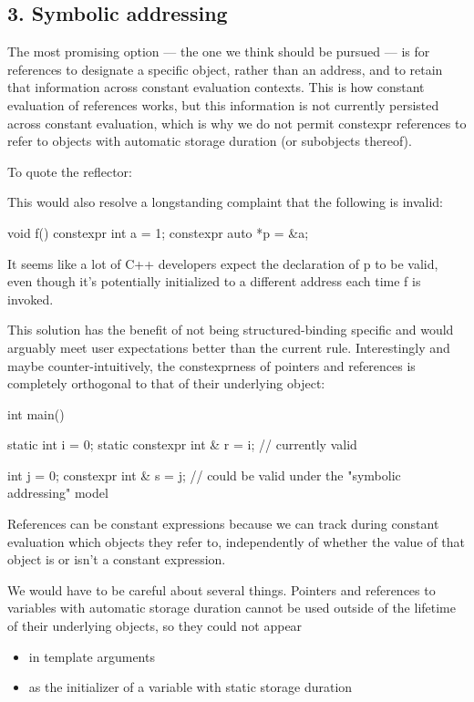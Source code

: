 \documentclass{wg21}
\begin{document}
\subsection{3. Symbolic addressing}

The most promising option --- the one we think should be pursued --- is for  references to designate a specific object, rather than an address,
and to retain that information across constant evaluation contexts.
This is how constant evaluation of references works, but this information is not currently persisted across constant evaluation, which is why we do not permit
constexpr references to refer to objects with automatic storage duration (or subobjects thereof).

To quote the reflector: %

\begin{quoteblock}
This would also resolve a longstanding complaint that the following is invalid:
\begin{colorblock}
void f() {
    constexpr int a = 1;
    constexpr auto *p = &a;
}
\end{colorblock}

It seems like a lot of C++ developers expect the declaration of p to be valid, even though it's potentially initialized to a different address each time f is invoked.
\end{quoteblock}

This solution has the benefit of not being structured-binding specific and would arguably meet user expectations better than the current rule.
Interestingly and maybe counter-intuitively, the constexprness of pointers and references is completely orthogonal to that of their underlying object:

\begin{colorblock}
int main() {
    static int i = 0;
    static constexpr int & r = i; // currently valid

    int j = 0;
    constexpr int & s = j; // could be valid under the "symbolic addressing" model
}
\end{colorblock}

References can be constant expressions because we can track during constant evaluation which objects they refer to, independently of whether the value of that object is or isn't a constant expression.

We would have to be careful about several things.
Pointers and references to variables with automatic storage duration cannot be used outside of the lifetime of their underlying objects, so they could not appear
\begin{itemize}
  \item in template arguments
  \item as the initializer of a variable with static storage duration
\end{itemize}
\end{document}

